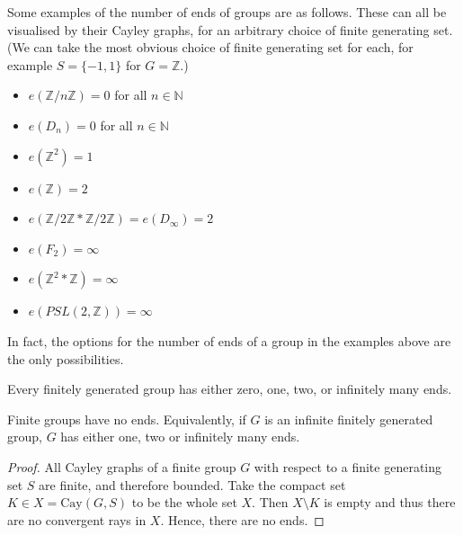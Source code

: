 \begin{example}
    Some examples of the number of ends of groups are as follows. These can all be visualised by their Cayley graphs, for an arbitrary choice of finite generating set. (We can take the most obvious choice of finite generating set for each, for example \(S = \{-1,1\}\) for \(G = \mathbb{Z}\).)
    \begin{multicols}{2}
    \begin{itemize}
        \item \(e(\mathbb{Z}/n\mathbb{Z}) = 0\) for all \(n \in \mathbb{N}\)
        \item \(e(D_n) = 0\) for all \(n \in \mathbb{N}\)
        \item \(e(\mathbb{Z}^2) = 1\)
        \item \(e(\mathbb{Z}) = 2\)
    \end{itemize}
    
        \columnbreak
        
    \begin{itemize}
        \item \(e(\mathbb{Z}/2\mathbb{Z} * \mathbb{Z}/2\mathbb{Z}) = e(D_{\infty}) = 2\)
        \item \(e(F_2) = \infty\)
        \item \(e(\mathbb{Z}^2 * \mathbb{Z}) = \infty\)
        \item \(e(PSL(2,\mathbb{Z})) = \infty\)
    \end{itemize}
    \end{multicols}
\end{example}

In fact, the options for the number of ends of a group in the examples above are the only possibilities.

\begin{theorem} \cite[p.~146--147]{bridson_haefliger_metric_1999}
\label{FH}
    Every finitely generated group has either zero, one, two, or infinitely many ends.
\end{theorem}

\begin{corollary}
    Finite groups have no ends. Equivalently, if \(G\) is an infinite finitely generated group, \(G\) has either one, two or infinitely many ends.
\end{corollary}

\begin{proof} %
    All Cayley graphs of a finite group \(G\) with respect to a finite generating set \(S\) are finite, and therefore bounded. Take the compact set \(K \in X = \mathrm{Cay}(G,S)\) to be the whole set \(X\). Then \(X \setminus K\) is empty and thus there are no convergent rays in \(X\). Hence, there are no ends.
\end{proof}

